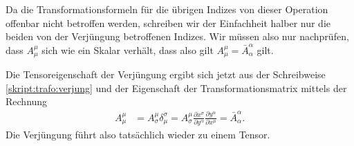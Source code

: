Da die Transformationsformeln für die übrigen Indizes von dieser
Operation offenbar nicht betroffen werden, schreiben wir der Einfachheit
halber nur die beiden von der Verjüngung betroffenen Indizes.
Wir müssen also nur nachprüfen, dass $A^\mu_\mu$ sich wie ein Skalar
verhält, dass also gilt $A^\mu_\mu=\bar A^\alpha_\alpha$ gilt.

Die Tensoreigenschaft der Verjüngung ergibt sich jetzt aus der Schreibweise
\eqref{skript:trafo:verjung}
und der Eigenschaft 
\label{label:trafo:t}
der Transformationsmatrix mittels der Rechnung
\begin{align*}
A^\mu_\mu
&=
A^\mu_\sigma
\delta^\sigma_\mu
=
A^\mu_\sigma
\frac{\partial x^\sigma}{\partial y^\alpha}
\frac{\partial y^\alpha}{\partial x^\mu}
=
\bar A^\alpha_\alpha.
\end{align*}
Die Verjüngung führt also tatsächlich wieder zu einem Tensor.

